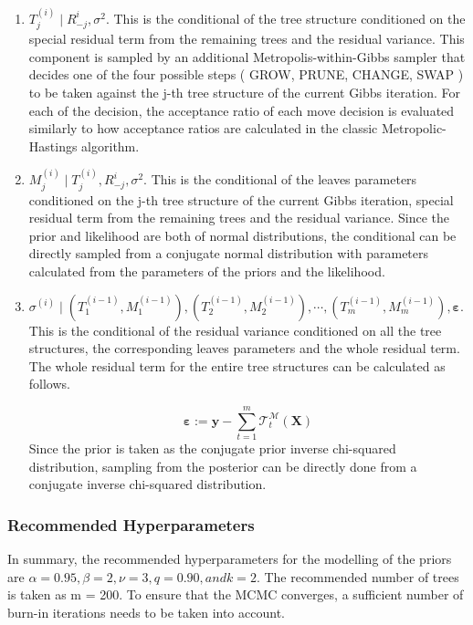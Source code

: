 \documentclass{usiinftr}
\begin{document}
\begin{enumerate}
\item $ T_j^{(i)} \mid R_{-j}^i, \sigma^2 $. This is the conditional of the tree structure conditioned on the special residual term from the remaining trees and the residual variance. This component is sampled by an additional Metropolis-within-Gibbs sampler that decides one of the four possible steps ( GROW, PRUNE, CHANGE, SWAP ) to be taken against the j-th tree structure of the current Gibbs iteration. For each of the decision, the acceptance ratio of each move decision is evaluated similarly to how acceptance ratios are calculated in the classic Metropolic-Hastings algorithm.
\item $ M_j^{(i)} \mid T_j^{(i)}, R_{-j}^i, \sigma^2 $. This is the conditional of the leaves parameters conditioned on the j-th tree structure of the current Gibbs iteration, special residual term from the remaining trees and the residual variance. Since the prior and likelihood are both of normal distributions, the conditional can be directly sampled from a conjugate normal distribution with parameters calculated from the parameters of the priors and the likelihood.
\item $\sigma^(i) \mid (T_1^{(i-1)},M_1^{(i-1)}),(T_2^{(i-1)},M_2^{(i-1)}), \cdots, (T_m^{(i-1)},M_m^{(i-1)}), \boldsymbol{\varepsilon}  $. This is the conditional of the residual variance conditioned on all the tree structures, the corresponding leaves parameters and the whole residual term. The whole residual term for the entire tree structures can be calculated as follows.

\begin{equation}
\boldsymbol{\varepsilon}:=\boldsymbol{y}-\sum_{t=1}^m \mathcal{T}_{t}^{\mathcal{M}}(\boldsymbol{X})
\end{equation}
Since the prior is taken as the conjugate prior inverse chi-squared distribution, sampling from the posterior can be directly done from a conjugate inverse chi-squared distribution.
\end{enumerate}

\subsubsection{Recommended Hyperparameters}\label{rec}
In summary, the recommended hyperparameters for the modelling of the priors are  $\alpha = 0.95, \beta =2, \nu = 3, q = 0.90, and k = 2$. The recommended number of trees is taken as m = 200. To ensure that the MCMC converges, a sufficient number of burn-in iterations needs to be taken into account.
\end{document}
